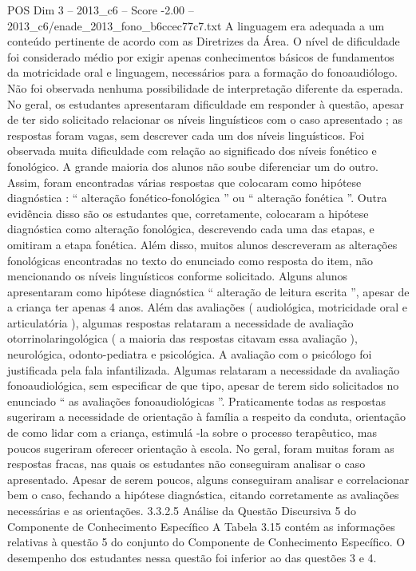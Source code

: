 \begin{textsample}{POS Dim 3 – 2013\_c6 – Score -2.00 – 2013\_c6/enade\_2013\_fono\_b6ccec77c7.txt}
A linguagem era adequada a um conteúdo pertinente de acordo com as Diretrizes da Área.
O nível de dificuldade foi considerado médio por exigir apenas conhecimentos básicos de fundamentos da motricidade oral e linguagem, necessários para a formação do fonoaudiólogo.
Não foi observada nenhuma possibilidade de interpretação diferente da esperada.
No geral, os estudantes apresentaram dificuldade em responder à questão, apesar de ter sido solicitado relacionar os níveis linguísticos com o caso apresentado ; as respostas foram vagas, sem descrever cada um dos níveis linguísticos.
Foi observada muita dificuldade com relação ao significado dos níveis fonético e fonológico.
A grande maioria dos alunos não soube diferenciar um do outro.
Assim, foram encontradas várias respostas que colocaram como hipótese diagnóstica : “ alteração fonético-fonológica ” ou “ alteração fonética ”.
Outra evidência disso são os estudantes que, corretamente, colocaram a hipótese diagnóstica como alteração fonológica, descrevendo cada uma das etapas, e omitiram a etapa fonética.
Além disso, muitos alunos descreveram as alterações fonológicas encontradas no texto do enunciado como resposta do item, não mencionando os níveis linguísticos conforme solicitado.
Alguns alunos apresentaram como hipótese diagnóstica “ alteração de leitura escrita ”, apesar de a criança ter apenas 4 anos.
Além das avaliações ( audiológica, motricidade oral e articulatória ), algumas respostas relataram a necessidade de avaliação otorrinolaringológica ( a maioria das respostas citavam essa avaliação ), neurológica, odonto-pediatra e psicológica.
A avaliação com o psicólogo foi justificada pela fala infantilizada.
Algumas relataram a necessidade da avaliação fonoaudiológica, sem especificar de que tipo, apesar de terem sido solicitados no enunciado “ as avaliações fonoaudiológicas ”.
Praticamente todas as respostas sugeriram a necessidade de orientação à família a respeito da conduta, orientação de como lidar com a criança, estimulá -la sobre o processo terapêutico, mas poucos sugeriram oferecer orientação à escola.
No geral, foram muitas foram as respostas fracas, nas quais os estudantes não conseguiram analisar o caso apresentado.
Apesar de serem poucos, alguns conseguiram analisar e correlacionar bem o caso, fechando a hipótese diagnóstica, citando corretamente as avaliações necessárias e as orientações. 3.3.2.5 Análise da Questão Discursiva 5 do Componente de Conhecimento Específico A Tabela 3.15 contém as informações relativas à questão 5 do conjunto do Componente de Conhecimento Específico.
O desempenho dos estudantes nessa questão foi inferior ao das questões 3 e 4.

\end{textsample}
